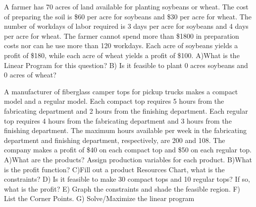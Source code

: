 \documentclass[11pt,epsfig]{article}
\begin{document}
\begin{problem}{20}
A farmer has 70 acres of land available for planting soybeans or wheat. The cost of preparing the soil is \$60 per acre for soybeans and \$30 per acre for wheat. The number of workdays of labor required is 3 days per acre for soybeans and 4 days per acre for wheat. The farmer cannot spend more than \$1800 in preparation costs nor can he use more than 120 workdays. Each acre of soybeans yields a profit of \$180, while each acre of wheat yields a profit of \$100.
\newline
A)What is the Linear Program for this question?
\newline
B) Is it feasible to plant 0 acres soybeans and 0 acres of wheat?

\vfill
\end{problem}

\newpage

\begin{problem}{50}
A manufacturer of fiberglass camper tops for pickup trucks makes a compact model and a regular model. Each compact top requires 5 hours from the fabricating department and 2 hours from the finishing department. Each regular top requires 4 hours from the fabricating department and 3 hours from the finishing department. The maximum hours available per week in the fabricating department and finishing department, respectively, are 200 and 108. The company makes a profit of \$40 on each compact top and \$50 on each regular top.
\newline
\newline
A)What are the products? Assign production variables for each product.
\vfill
B)What is the profit function?
\vfill
C)Fill out a product Resources Chart, what is the constraints?
\vfill
D) Is it feasible to make 30 compact tops and 10 regular tops? If so, what is the profit?
\vfill 
\newpage
E) Graph the constraints and shade the feasible region.
\vfill
F) List the Corner Points.
\vfill
G) Solve/Maximize the linear program


\vfill
\end{problem}










\showpoints
\end{document}
